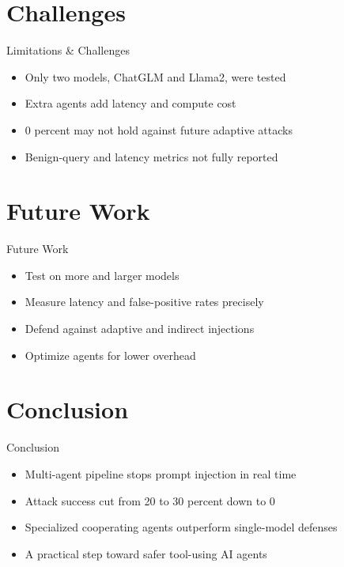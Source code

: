 \documentclass[10pt]{beamer}
\begin{document}
\section{Challenges}
\begin{frame}{Limitations \& Challenges}
\begin{itemize}
  \item Only two models, ChatGLM and Llama2, were tested
  \item Extra agents add latency and compute cost
  \item 0 percent may not hold against future adaptive attacks
  \item Benign-query and latency metrics not fully reported
\end{itemize}
\end{frame}

\section{Future Work}
\begin{frame}{Future Work}
\begin{itemize}
  \item Test on more and larger models
  \item Measure latency and false-positive rates precisely
  \item Defend against adaptive and indirect injections
  \item Optimize agents for lower overhead
\end{itemize}
\end{frame}

\section{Conclusion}
\begin{frame}{Conclusion}
\begin{itemize}
  \item Multi-agent pipeline stops prompt injection in real time
  \item Attack success cut from 20 to 30 percent down to 0
  \item Specialized cooperating agents outperform single-model defenses
  \item A practical step toward safer tool-using AI agents
\end{itemize}
\end{frame}
\end{document}
